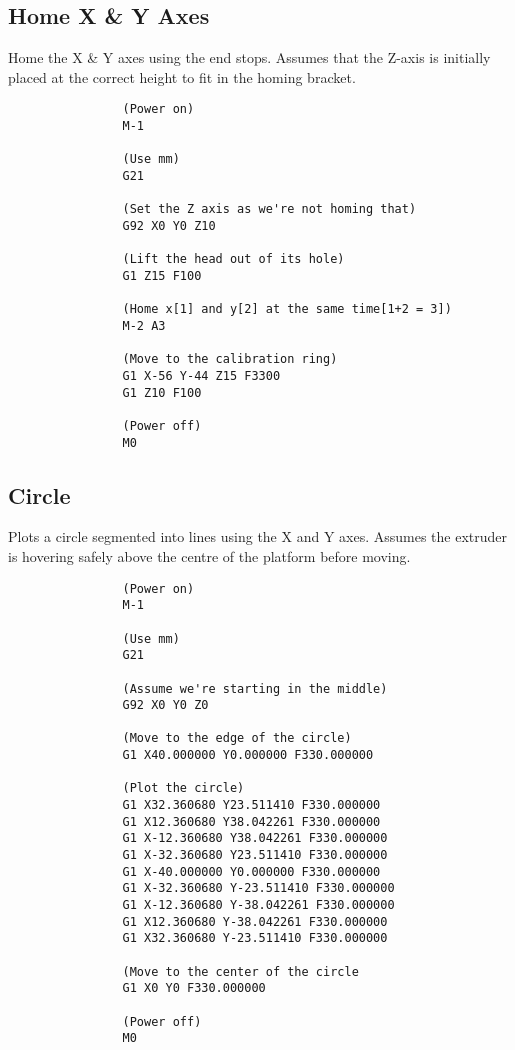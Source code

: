 		\subsection{Home X \& Y Axes}
			
			Home the X \& Y axes using the end stops. Assumes that the Z-axis is
			initially placed at the correct height to fit in the homing bracket.
			
			\begin{verbatim}
				(Power on)
				M-1
				
				(Use mm)
				G21
				
				(Set the Z axis as we're not homing that)
				G92 X0 Y0 Z10
				
				(Lift the head out of its hole)
				G1 Z15 F100
				
				(Home x[1] and y[2] at the same time[1+2 = 3])
				M-2 A3
				
				(Move to the calibration ring)
				G1 X-56 Y-44 Z15 F3300
				G1 Z10 F100
				
				(Power off)
				M0
			\end{verbatim}
			
			\label{sec:gcode_home_xy}
		
		\subsection{Circle}
			
			Plots a circle segmented into lines using the X and Y axes. Assumes the
			extruder is hovering safely above the centre of the platform before
			moving.
			
			\begin{verbatim}
				(Power on)
				M-1
				
				(Use mm)
				G21
				
				(Assume we're starting in the middle)
				G92 X0 Y0 Z0
				
				(Move to the edge of the circle)
				G1 X40.000000 Y0.000000 F330.000000
				
				(Plot the circle)
				G1 X32.360680 Y23.511410 F330.000000
				G1 X12.360680 Y38.042261 F330.000000
				G1 X-12.360680 Y38.042261 F330.000000
				G1 X-32.360680 Y23.511410 F330.000000
				G1 X-40.000000 Y0.000000 F330.000000
				G1 X-32.360680 Y-23.511410 F330.000000
				G1 X-12.360680 Y-38.042261 F330.000000
				G1 X12.360680 Y-38.042261 F330.000000
				G1 X32.360680 Y-23.511410 F330.000000
				
				(Move to the center of the circle
				G1 X0 Y0 F330.000000
				
				(Power off)
				M0
			\end{verbatim}
